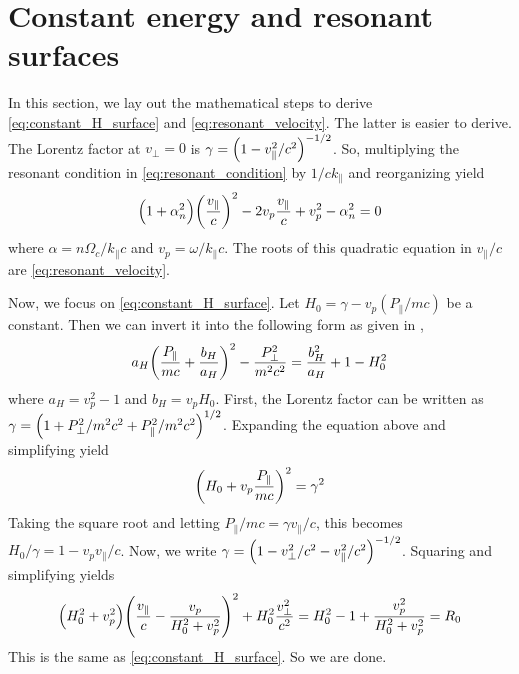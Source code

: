 \section{Constant energy and resonant surfaces}\label{sec:RH_surface_derivation}

In this section, we lay out the mathematical steps to derive
\cref{eq:constant_H_surface} and \cref{eq:resonant_velocity}. The latter is
easier to derive. The Lorentz factor at $v_\perp=0$ is
$\gamma=\qty(1-v_\|^2/c^2)^{-1/2}$. So, multiplying the resonant
condition in \cref{eq:resonant_condition} by $1/ck_\|$ and reorganizing yield
\begin{equation}
    \qty(1+\alpha_n^2)\qty(\frac{v_\|}{c})^2-2v_p\frac{v_\|}{c}+v_p^2-\alpha_n^2=0
\end{equation}
where $\alpha=n\Omega_c/k_\|c$ and $v_p=\omega/k_\|c$. The roots of this
quadratic equation in $v_\|/c$  are \cref{eq:resonant_velocity}.

Now, we focus on \cref{eq:constant_H_surface}. Let $H_0=\gamma-v_p(P_\|/mc)$ be
a constant. Then we can invert it into the following form as given in
\cite{Karimabadi1990},
\begin{equation}
    a_H\qty(\frac{P_\|}{mc}+\frac{b_H}{a_H})^2-\frac{P_\perp^2}{m^2c^2}=\frac{b_H^2}{a_H}+1-H_0^2
\end{equation}
where $a_H=v_p^2-1$ and $b_H=v_pH_0$. First, the Lorentz factor can be written
as $\gamma=\qty(1+P_\perp^2/m^2c^2+P_\|^2/m^2c^2)^{1/2}$. Expanding the equation
above and simplifying yield
\begin{equation}
    \qty(H_0+v_p\frac{P_\|}{mc})^2=\gamma^2
\end{equation}
Taking the square root and letting $P_\|/mc=\gamma v_\|/c$, this becomes
$H_0/\gamma=1-v_pv_\|/c$. Now, we write
$\gamma=\qty(1-v_\perp^2/c^2-v_\|^2/c^2)^{-1/2}$. Squaring and simplifying
yields
\begin{equation}
    \qty(H_0^2+v_p^2)\qty(\frac{v_\|}{c}-\frac{v_p}{H_0^2+v_p^2})^2+H_0^2\frac{v_\perp^2}{c^2}=H_0^2-1+\frac{v_p^2}{H_0^2+v_p^2}=R_0
\end{equation}
This is the same as \cref{eq:constant_H_surface}. So we are done.
